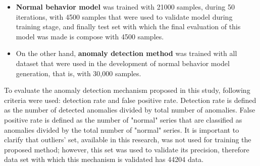 \begin{itemize}
\item \textbf{Normal behavior model} was trained with 21000 samples, during 50 iterations, with 4500 samples that were used to validate model during training stage, and finally test set with which the final evaluation of this model was made is compose with 4500 samples.
\item On the other hand, \textbf{anomaly detection method} was trained with all dataset that were used in the development of normal behavior model generation, that is, with 30,000 samples.
\end{itemize}

To evaluate the anomaly detection mechanism proposed in this study, following criteria were used: detection rate and false positive rate. Detection rate is defined as the number of detected anomalies divided by total number of anomalies. False positive rate is defined as the number of "normal" series that are classified as anomalies divided by the total number of "normal" series. It is important to clarify that outliers' set, available in this research, was not used for training the proposed method; however, this set was used to validate its precision, therefore data set with which this mechanism is validated has 44204 data.
 
